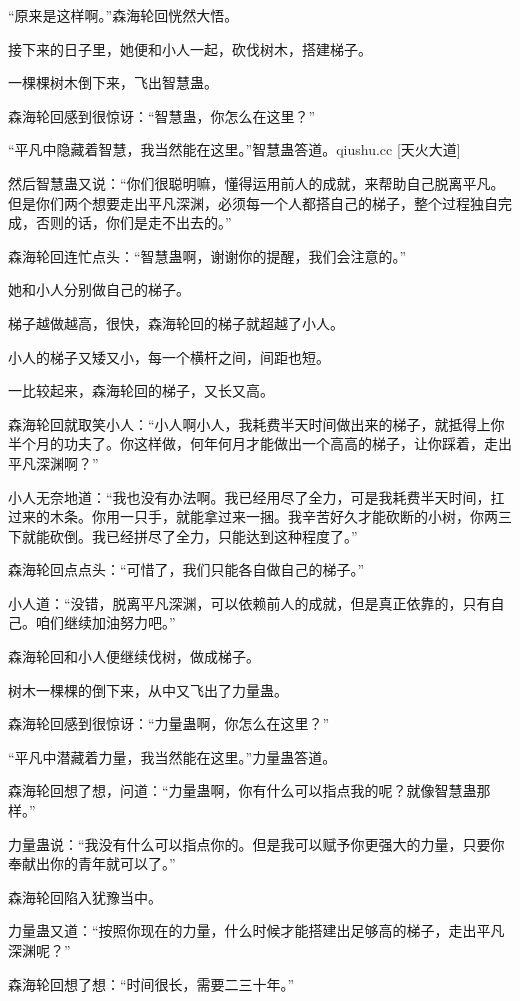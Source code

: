 \begin{this_body}
“原来是这样啊。”森海轮回恍然大悟。

接下来的日子里，她便和小人一起，砍伐树木，搭建梯子。

一棵棵树木倒下来，飞出智慧蛊。

森海轮回感到很惊讶：“智慧蛊，你怎么在这里？”

“平凡中隐藏着智慧，我当然能在这里。”智慧蛊答道。qiushu.cc [天火大道]

然后智慧蛊又说：“你们很聪明嘛，懂得运用前人的成就，来帮助自己脱离平凡。但是你们两个想要走出平凡深渊，必须每一个人都搭自己的梯子，整个过程独自完成，否则的话，你们是走不出去的。”

森海轮回连忙点头：“智慧蛊啊，谢谢你的提醒，我们会注意的。”

她和小人分别做自己的梯子。

梯子越做越高，很快，森海轮回的梯子就超越了小人。

小人的梯子又矮又小，每一个横杆之间，间距也短。

一比较起来，森海轮回的梯子，又长又高。

森海轮回就取笑小人：“小人啊小人，我耗费半天时间做出来的梯子，就抵得上你半个月的功夫了。你这样做，何年何月才能做出一个高高的梯子，让你踩着，走出平凡深渊啊？”

小人无奈地道：“我也没有办法啊。我已经用尽了全力，可是我耗费半天时间，扛过来的木条。你用一只手，就能拿过来一捆。我辛苦好久才能砍断的小树，你两三下就能砍倒。我已经拼尽了全力，只能达到这种程度了。”

森海轮回点点头：“可惜了，我们只能各自做自己的梯子。”

小人道：“没错，脱离平凡深渊，可以依赖前人的成就，但是真正依靠的，只有自己。咱们继续加油努力吧。”

森海轮回和小人便继续伐树，做成梯子。

树木一棵棵的倒下来，从中又飞出了力量蛊。

森海轮回感到很惊讶：“力量蛊啊，你怎么在这里？”

“平凡中潜藏着力量，我当然能在这里。”力量蛊答道。

森海轮回想了想，问道：“力量蛊啊，你有什么可以指点我的呢？就像智慧蛊那样。”

力量蛊说：“我没有什么可以指点你的。但是我可以赋予你更强大的力量，只要你奉献出你的青年就可以了。”

森海轮回陷入犹豫当中。

力量蛊又道：“按照你现在的力量，什么时候才能搭建出足够高的梯子，走出平凡深渊呢？”

森海轮回想了想：“时间很长，需要二三十年。”


\end{this_body}
